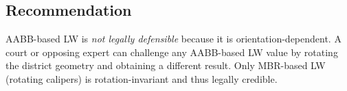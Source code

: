 \subsection{Recommendation}

AABB-based LW is \emph{not legally defensible} because it is orientation-dependent.
A court or opposing expert can challenge any AABB-based LW value by rotating
the district geometry and obtaining a different result.
Only MBR-based LW (rotating calipers) is rotation-invariant and thus legally credible.
